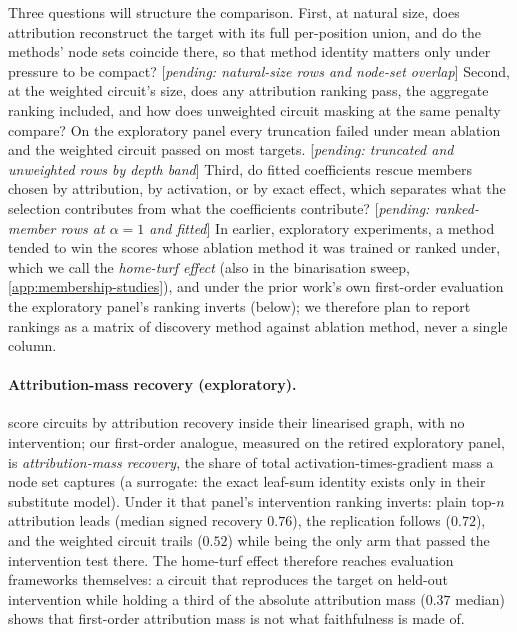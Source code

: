 \documentclass[10pt]{article}
\newif\ifexternal
\DeclareRobustCommand{\pending}[1]{%
  \ifexternal
    \ifvmode\textcolor{black!55}{[to be added]}\else\unskip\fi
  \else
    \textcolor{red!70!black}{[\textit{pending: #1}]}%
  \fi}
\begin{document}
Three questions will structure the comparison.
First, at natural size, does attribution reconstruct the target with its full per-position union, and do the methods' node sets coincide there, so that method identity matters only under pressure to be compact? \pending{natural-size rows and node-set overlap}
Second, at the weighted circuit's size, does any attribution ranking pass, the aggregate ranking included, and how does unweighted circuit masking at the same penalty compare? On the exploratory panel every truncation failed under mean ablation and the weighted circuit passed on most targets. \pending{truncated and unweighted rows by depth band}
Third, do fitted coefficients rescue members chosen by attribution, by activation, or by exact effect, which separates what the selection contributes from what the coefficients contribute? \pending{ranked-member rows at $\alpha = 1$ and fitted}
In earlier, exploratory experiments, a method tended to win the scores whose ablation method it was trained or ranked under, which we call the \emph{home-turf effect} (also in the binarisation sweep, \cref{app:membership-studies}), and under the prior work's own first-order evaluation the exploratory panel's ranking inverts (below); we therefore plan to report rankings as a matrix of discovery method against ablation method, never a single column.

\paragraph{Attribution-mass recovery (exploratory).}
\citet{ge2024automatically} score circuits by attribution recovery inside their linearised graph, with no intervention; our first-order analogue, measured on the retired exploratory panel, is \emph{attribution-mass recovery}, the share of total activation-times-gradient mass a node set captures (a surrogate: the exact leaf-sum identity exists only in their substitute model).
Under it that panel's intervention ranking inverts: plain top-$n$ attribution leads (median signed recovery $0.76$), the replication follows ($0.72$), and the weighted circuit trails ($0.52$) while being the only arm that passed the intervention test there.
The home-turf effect therefore reaches evaluation frameworks themselves: a circuit that reproduces the target on held-out intervention while holding a third of the absolute attribution mass ($0.37$ median) shows that first-order attribution mass is not what faithfulness is made of.
\end{document}
